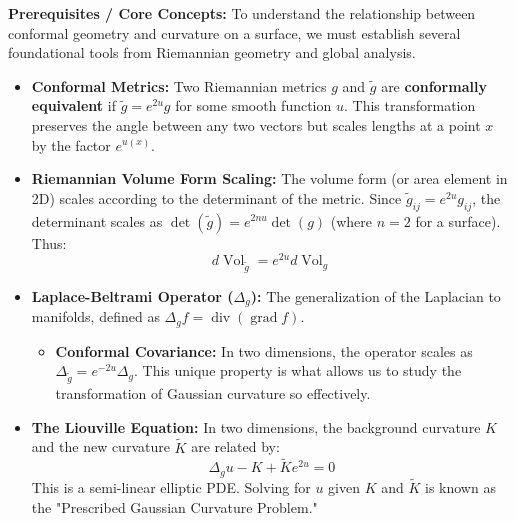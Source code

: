 \begin{solution}
\textbf{Prerequisites / Core Concepts:}
To understand the relationship between conformal geometry and curvature on a surface, we must establish several foundational tools from Riemannian geometry and global analysis.
\begin{itemize}
    \item \textbf{Conformal Metrics:} 
    Two Riemannian metrics $g$ and $\widetilde{g}$ are \textbf{conformally equivalent} if $\widetilde{g} = e^{2u}g$ for some smooth function $u$. This transformation preserves the angle between any two vectors but scales lengths at a point $x$ by the factor $e^{u(x)}$. 
    
    \item \textbf{Riemannian Volume Form Scaling:} 
    The volume form (or area element in 2D) scales according to the determinant of the metric. Since $\widetilde{g}_{ij} = e^{2u}g_{ij}$, the determinant scales as $\det(\widetilde{g}) = e^{2nu} \det(g)$ (where $n=2$ for a surface). Thus:
    \begin{equation*}
        d\operatorname{Vol}_{\widetilde{g}} = e^{2u} d\operatorname{Vol}_g
    \end{equation*}

    \item \textbf{Laplace-Beltrami Operator ($\Delta_g$):} 
    The generalization of the Laplacian to manifolds, defined as $\Delta_g f = \operatorname{div}(\operatorname{grad} f)$. 
    \begin{itemize}
        \item \textbf{Conformal Covariance:} In two dimensions, the operator scales as $\Delta_{\widetilde{g}} = e^{-2u}\Delta_g$. This unique property is what allows us to study the transformation of Gaussian curvature so effectively.
    \end{itemize}
    
    \item \textbf{The Liouville Equation:} 
    In two dimensions, the background curvature $K$ and the new curvature $\widetilde{K}$ are related by:
    \begin{equation*}
        \Delta_g u - K + \widetilde{K}e^{2u} = 0
    \end{equation*}
    This is a semi-linear elliptic PDE. Solving for $u$ given $K$ and $\widetilde{K}$ is known as the "Prescribed Gaussian Curvature Problem."


\end{itemize}
\end{solution}
